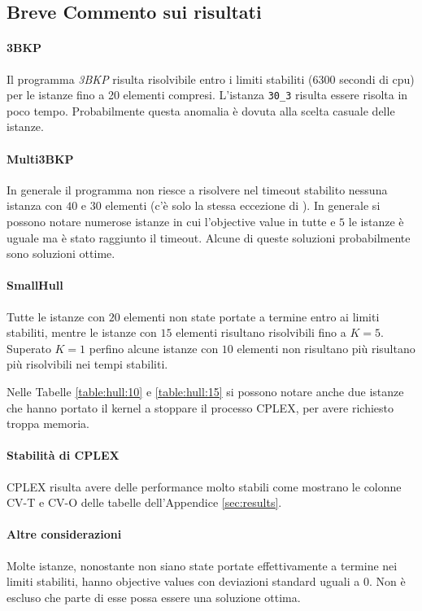 \subsection{Breve Commento sui risultati}



\paragraph{3BKP}
Il programma \emph{3BKP} risulta risolvibile entro i limiti stabiliti ($6300$ secondi di cpu)
per le istanze fino a 20 elementi compresi. L'istanza \verb|30_3| risulta
essere risolta in poco tempo. Probabilmente questa anomalia è dovuta alla
scelta casuale delle istanze.

\paragraph{Multi3BKP}
In generale il programma  non riesce a risolvere nel timeout
stabilito nessuna istanza con $40$ e $30$ elementi (c'è solo la stessa eccezione
di ). 
In generale si possono notare numerose istanze in cui l'objective value in tutte
e $5$ le istanze è uguale ma è stato raggiunto il timeout. Alcune di queste
soluzioni probabilmente sono soluzioni ottime.


\paragraph{SmallHull}
Tutte le istanze con $20$ elementi non state portate a termine entro ai limiti
stabiliti, mentre le istanze con $15$ elementi risultano risolvibili fino a
$K = 5$. 
Superato $K = 1$ perfino alcune istanze con $10$ elementi non risultano più risultano
più risolvibili nei tempi stabiliti.

Nelle Tabelle \ref{table:hull:10} e \ref{table:hull:15} si possono notare
anche due istanze che hanno portato  il kernel a stoppare il processo CPLEX,
per avere richiesto troppa memoria. 

\paragraph{Stabilità di CPLEX}
CPLEX risulta avere delle performance molto stabili come mostrano le colonne
CV-T e CV-O delle tabelle dell'Appendice \ref{sec:results}.

\paragraph{Altre considerazioni}
Molte istanze, nonostante non siano state portate effettivamente a termine nei
limiti stabiliti, hanno objective values con deviazioni standard uguali a $0$.
Non è escluso che parte di esse possa essere una soluzione ottima.




